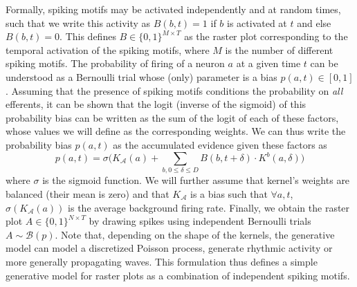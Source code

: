\documentclass[runningheads]{llncs}
\newcommand{\presynaddr}{a} %
\newcommand{\postsynaddr}{b} %
\newcommand{\presynaddrspace}{\mathcal{A}} %
\newcommand{\synapticdelay}{\delta} %
\newcommand{\kernel}{K} %
\begin{document}
Formally, spiking motifs may be activated independently and at random times, such that we write this activity as $B(\postsynaddr, t)=1$ if $b$ is activated at $t$ and else $B(\postsynaddr, t)=0$. This defines $B\in \{0, 1\}^{M\times T}$ as the raster plot corresponding to the temporal activation of the spiking motifs, where $M$ is the number of different spiking motifs. The probability of firing of a neuron $a$ at a given time $t$ can be understood as a Bernoulli trial whose (only) parameter is a bias $p(\presynaddr, t) \in [0, 1]$. Assuming that the presence of spiking motifs conditions the probability on \emph{all} efferents, it can be shown that the logit (inverse of the sigmoid) of this probability bias can be written as the sum of the logit of each of these factors, whose values we will define as the corresponding weights. We can thus write the probability bias $p(a, t)$ as the accumulated evidence given these factors as 
\begin{equation*}
p(\presynaddr, t) = \sigma\big(\kernel_\presynaddrspace(\presynaddr) + \sum_{\postsynaddr, 0 \le \synapticdelay \le D} B(\postsynaddr, t+\synapticdelay) \cdot \kernel^\postsynaddr(\presynaddr, \synapticdelay) \big)  
\end{equation*}
where $\sigma$ is the sigmoid function. We will further assume that kernel's weights are balanced (their mean is zero) and that $\kernel_\presynaddrspace$ is a bias such that $\forall \presynaddr, t$, $\sigma(\kernel_\presynaddrspace(\presynaddr))$ is the average background firing rate. 
Finally, we obtain the raster plot $A\in \{0, 1\}^{N\times T}$ by drawing spikes using independent Bernoulli trials $A \sim \mathcal{B}(p)$. Note that, depending on the shape of the kernels, the generative model can model a discretized Poisson process, generate rhythmic activity or more generally propagating waves. This formulation thus defines a simple generative model for raster plots as a combination of independent spiking motifs. 
%
\end{document}
